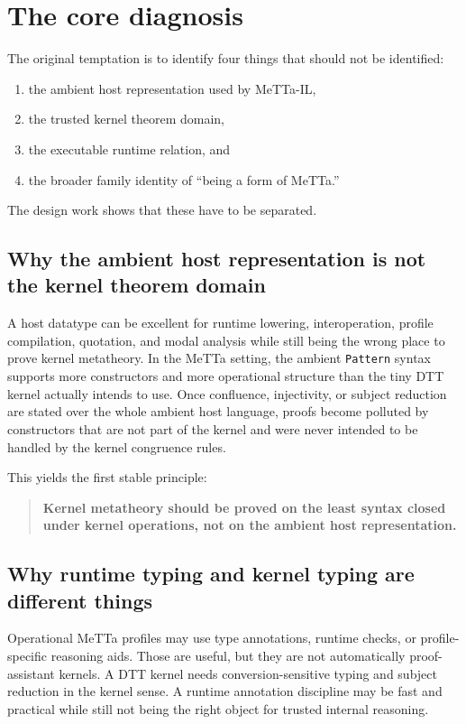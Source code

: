 \documentclass[11pt]{article}
\begin{document}
\section{The core diagnosis}

The original temptation is to identify four things that should not be identified:
\begin{enumerate}
  \item the ambient host representation used by MeTTa-IL,
  \item the trusted kernel theorem domain,
  \item the executable runtime relation, and
  \item the broader family identity of ``being a form of MeTTa.''
\end{enumerate}

The design work shows that these have to be separated.

\subsection{Why the ambient host representation is not the kernel theorem domain}

A host datatype can be excellent for runtime lowering, interoperation, profile compilation, quotation, and modal analysis while still being the wrong place to prove kernel metatheory. In the MeTTa setting, the ambient \texttt{Pattern} syntax supports more constructors and more operational structure than the tiny DTT kernel actually intends to use. Once confluence, injectivity, or subject reduction are stated over the whole ambient host language, proofs become polluted by constructors that are not part of the kernel and were never intended to be handled by the kernel congruence rules.

This yields the first stable principle:

\begin{quote}
\textbf{Kernel metatheory should be proved on the least syntax closed under kernel operations, not on the ambient host representation.}
\end{quote}

\subsection{Why runtime typing and kernel typing are different things}

Operational MeTTa profiles may use type annotations, runtime checks, or profile-specific reasoning aids. Those are useful, but they are not automatically proof-assistant kernels. A DTT kernel needs conversion-sensitive typing and subject reduction in the kernel sense. A runtime annotation discipline may be fast and practical while still not being the right object for trusted internal reasoning.
\end{document}

